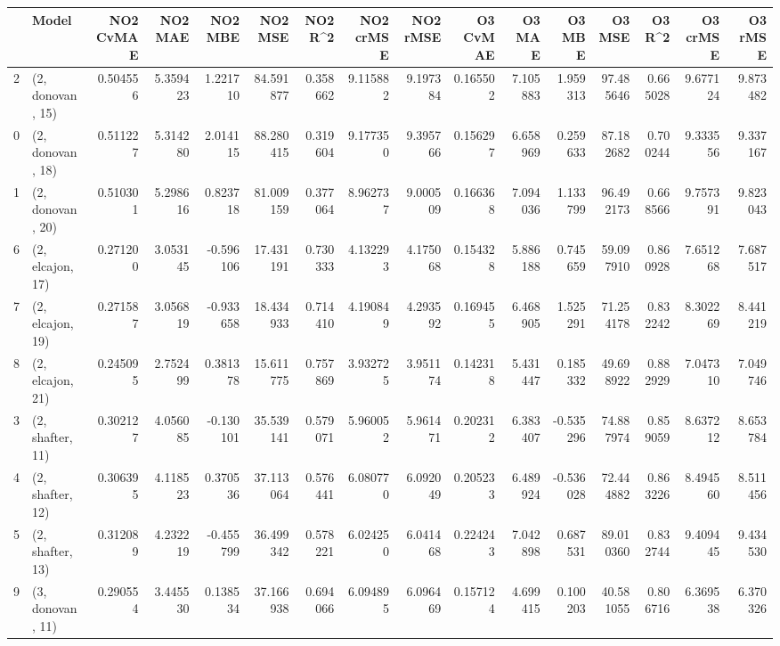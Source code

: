 \begin{tabular}{llrrrrrrrrrrrrrr}
\toprule
{} &             Model &  NO2 CvMAE &   NO2 MAE &   NO2 MBE &    NO2 MSE &   NO2 R\textasciicircum2 &  NO2 crMSE &  NO2 rMSE &  O3 CvMAE &    O3 MAE &    O3 MBE &      O3 MSE &    O3 R\textasciicircum2 &   O3 crMSE &    O3 rMSE \\
\midrule
2  &  (2, donovan, 15) &   0.504556 &  5.359423 &  1.221710 &  84.591877 &  0.358662 &   9.115882 &  9.197384 &  0.165502 &  7.105883 &  1.959313 &   97.485646 &  0.665028 &   9.677124 &   9.873482 \\
0  &  (2, donovan, 18) &   0.511227 &  5.314280 &  2.014115 &  88.280415 &  0.319604 &   9.177350 &  9.395766 &  0.156297 &  6.658969 &  0.259633 &   87.182682 &  0.700244 &   9.333556 &   9.337167 \\
1  &  (2, donovan, 20) &   0.510301 &  5.298616 &  0.823718 &  81.009159 &  0.377064 &   8.962737 &  9.000509 &  0.166368 &  7.094036 &  1.133799 &   96.492173 &  0.668566 &   9.757391 &   9.823043 \\
6  &  (2, elcajon, 17) &   0.271200 &  3.053145 & -0.596106 &  17.431191 &  0.730333 &   4.132293 &  4.175068 &  0.154328 &  5.886188 &  0.745659 &   59.097910 &  0.860928 &   7.651268 &   7.687517 \\
7  &  (2, elcajon, 19) &   0.271587 &  3.056819 & -0.933658 &  18.434933 &  0.714410 &   4.190849 &  4.293592 &  0.169455 &  6.468905 &  1.525291 &   71.254178 &  0.832242 &   8.302269 &   8.441219 \\
8  &  (2, elcajon, 21) &   0.245095 &  2.752499 &  0.381378 &  15.611775 &  0.757869 &   3.932725 &  3.951174 &  0.142318 &  5.431447 &  0.185332 &   49.698922 &  0.882929 &   7.047310 &   7.049746 \\
3  &  (2, shafter, 11) &   0.302127 &  4.056085 & -0.130101 &  35.539141 &  0.579071 &   5.960052 &  5.961471 &  0.202312 &  6.383407 & -0.535296 &   74.887974 &  0.859059 &   8.637212 &   8.653784 \\
4  &  (2, shafter, 12) &   0.306395 &  4.118523 &  0.370536 &  37.113064 &  0.576441 &   6.080770 &  6.092049 &  0.205233 &  6.489924 & -0.536028 &   72.444882 &  0.863226 &   8.494560 &   8.511456 \\
5  &  (2, shafter, 13) &   0.312089 &  4.232219 & -0.455799 &  36.499342 &  0.578221 &   6.024250 &  6.041468 &  0.224243 &  7.042898 &  0.687531 &   89.010360 &  0.832744 &   9.409445 &   9.434530 \\
9  &  (3, donovan, 11) &   0.290554 &  3.445530 &  0.138534 &  37.166938 &  0.694066 &   6.094895 &  6.096469 &  0.157124 &  4.699415 &  0.100203 &   40.581055 &  0.806716 &   6.369538 &   6.370326 \\

\end{tabular}
